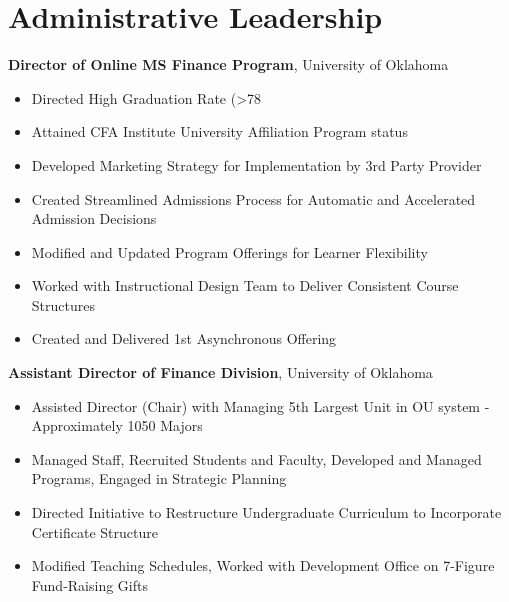 \documentclass[11pt,a4paper,]{awesome-cv}
\begin{document}
\makecvheader






\section{Administrative Leadership}\label{administrative-leadership}

\textbf{Director of Online MS Finance Program}, University of Oklahoma

\begin{itemize}
\item Directed High Graduation Rate (>78%
\item Attained CFA Institute University Affiliation Program status
\item Developed Marketing Strategy for Implementation by 3rd Party Provider
\item Created Streamlined Admissions Process for Automatic and Accelerated Admission Decisions
\item Modified and Updated Program Offerings for Learner Flexibility
\item Worked with Instructional Design Team to Deliver Consistent Course Structures
\item Created and Delivered 1st Asynchronous Offering
\end{itemize}

\textbf{Assistant Director of Finance Division}, University of Oklahoma

\begin{itemize}
\item Assisted Director (Chair) with Managing 5th Largest Unit in OU system - Approximately 1050 Majors
\item Managed Staff, Recruited Students and Faculty, Developed and Managed Programs, Engaged in Strategic Planning
\item Directed Initiative to Restructure Undergraduate Curriculum to Incorporate Certificate Structure
\item Modified Teaching Schedules, Worked with Development Office on 7-Figure Fund-Raising Gifts
\end{itemize}
\end{document}
